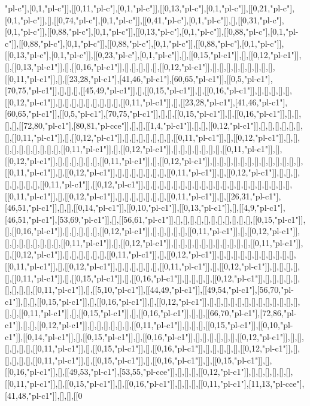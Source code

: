 "pl-c"],[0,1,"pl-c"]],[[0,11,"pl-c"],[0,1,"pl-c"]],[[0,13,"pl-c"],[0,1,"pl-c"]],[[0,21,"pl-c"],[0,1,"pl-c"]],[],[[0,74,"pl-c"],[0,1,"pl-c"]],[[0,41,"pl-c"],[0,1,"pl-c"]],[],[[0,31,"pl-c"],[0,1,"pl-c"]],[[0,88,"pl-c"],[0,1,"pl-c"]],[[0,13,"pl-c"],[0,1,"pl-c"]],[[0,88,"pl-c"],[0,1,"pl-c"]],[[0,88,"pl-c"],[0,1,"pl-c"]],[[0,88,"pl-c"],[0,1,"pl-c"]],[[0,88,"pl-c"],[0,1,"pl-c"]],[[0,13,"pl-c"],[0,1,"pl-c"]],[[0,23,"pl-c"],[0,1,"pl-c"]],[],[[0,15,"pl-c1"]],[],[[0,12,"pl-c1"]],[],[[0,13,"pl-c1"]],[],[[0,16,"pl-c1"]],[],[],[],[],[],[[0,12,"pl-c1"]],[],[],[],[],[],[],[],[],[],[[0,11,"pl-c1"]],[],[[23,28,"pl-c1"],[41,46,"pl-c1"],[60,65,"pl-c1"]],[[0,5,"pl-c1"],[70,75,"pl-c1"]],[],[],[],[[45,49,"pl-c1"]],[],[[0,15,"pl-c1"]],[],[[0,16,"pl-c1"]],[],[],[],[],[],[[0,12,"pl-c1"]],[],[],[],[],[],[],[],[],[],[[0,11,"pl-c1"]],[],[[23,28,"pl-c1"],[41,46,"pl-c1"],[60,65,"pl-c1"]],[[0,5,"pl-c1"],[70,75,"pl-c1"]],[],[],[[0,15,"pl-c1"]],[],[[0,16,"pl-c1"]],[],[],[],[],[[72,80,"pl-c1"],[80,81,"pl-cce"]],[],[],[[1,4,"pl-c1"]],[],[],[[0,12,"pl-c1"]],[],[],[],[],[],[],[],[[0,11,"pl-c1"]],[],[[0,12,"pl-c1"]],[],[],[],[],[],[],[],[[0,11,"pl-c1"]],[],[[0,12,"pl-c1"]],[],[],[],[],[],[],[],[],[],[],[[0,11,"pl-c1"]],[],[[0,12,"pl-c1"]],[],[],[],[],[],[],[],[[0,11,"pl-c1"]],[],[[0,12,"pl-c1"]],[],[],[],[],[],[],[[0,11,"pl-c1"]],[],[[0,12,"pl-c1"]],[],[],[],[],[],[],[],[],[],[],[],[],[],[[0,11,"pl-c1"]],[],[[0,12,"pl-c1"]],[],[],[],[],[],[],[],[[0,11,"pl-c1"]],[],[[0,12,"pl-c1"]],[],[],[],[],[],[],[],[],[[0,11,"pl-c1"]],[[0,12,"pl-c1"]],[],[],[],[],[],[],[],[],[],[],[],[],[],[],[],[],[],[],[],[],[],[[0,11,"pl-c1"]],[],[[0,12,"pl-c1"]],[],[],[],[],[],[],[],[[0,11,"pl-c1"]],[],[[26,31,"pl-c1"],[46,51,"pl-c1"]],[],[],[[0,14,"pl-c1"]],[[0,10,"pl-c1"]],[[0,13,"pl-c1"]],[],[[4,9,"pl-c1"],[46,51,"pl-c1"],[53,69,"pl-c1"]],[],[[56,61,"pl-c1"]],[],[],[],[],[],[],[],[],[],[],[],[[0,15,"pl-c1"]],[],[[0,16,"pl-c1"]],[],[],[],[],[],[[0,12,"pl-c1"]],[],[],[],[],[],[[0,11,"pl-c1"]],[],[[0,12,"pl-c1"]],[],[],[],[],[],[],[],[],[[0,11,"pl-c1"]],[],[[0,12,"pl-c1"]],[],[],[],[],[],[],[],[],[],[],[],[[0,11,"pl-c1"]],[],[[0,12,"pl-c1"]],[],[],[],[],[],[],[[0,11,"pl-c1"]],[],[[0,12,"pl-c1"]],[],[],[],[],[],[],[],[],[],[],[],[[0,11,"pl-c1"]],[],[[0,12,"pl-c1"]],[],[],[],[],[],[],[[0,11,"pl-c1"]],[],[[0,12,"pl-c1"]],[],[],[],[],[],[[0,11,"pl-c1"]],[],[[0,15,"pl-c1"]],[],[[0,16,"pl-c1"]],[],[],[],[],[[0,12,"pl-c1"]],[],[],[],[],[],[],[],[],[],[[0,11,"pl-c1"]],[],[[5,10,"pl-c1"]],[[44,49,"pl-c1"]],[[49,54,"pl-c1"],[56,70,"pl-c1"]],[],[],[[0,15,"pl-c1"]],[],[[0,16,"pl-c1"]],[],[[0,12,"pl-c1"]],[],[],[],[],[],[],[],[],[],[],[],[],[],[],[],[[0,11,"pl-c1"]],[],[[0,15,"pl-c1"]],[],[[0,16,"pl-c1"]],[],[],[[66,70,"pl-c1"],[72,86,"pl-c1"]],[],[],[[0,12,"pl-c1"]],[],[],[],[],[],[],[[0,11,"pl-c1"]],[],[],[],[[0,15,"pl-c1"]],[[0,10,"pl-c1"]],[[0,14,"pl-c1"]],[],[[0,15,"pl-c1"]],[],[[0,16,"pl-c1"]],[],[],[],[],[],[],[[0,12,"pl-c1"]],[],[],[],[],[],[],[[0,11,"pl-c1"]],[],[[0,15,"pl-c1"]],[],[[0,16,"pl-c1"]],[],[],[],[],[],[[0,12,"pl-c1"]],[],[],[],[],[],[[0,11,"pl-c1"]],[],[[0,15,"pl-c1"]],[],[[0,16,"pl-c1"]],[],[[0,15,"pl-c1"]],[],[[0,16,"pl-c1"]],[],[[49,53,"pl-c1"],[53,55,"pl-cce"]],[],[],[],[[0,12,"pl-c1"]],[],[],[],[],[],[],[[0,11,"pl-c1"]],[],[[0,15,"pl-c1"]],[],[[0,16,"pl-c1"]],[],[],[],[[0,11,"pl-c1"],[11,13,"pl-cce"],[41,48,"pl-c1"]],[],[],[[0
